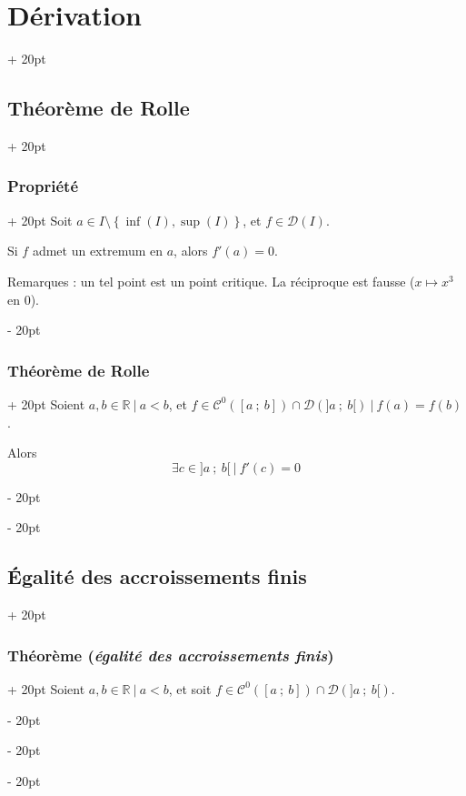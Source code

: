 \documentclass[a4paper, 12pt, twoside]{article}
\newcommand{\R}{\mathbb{R}} %
\newcommand{\seg}[2]{\left[ #1\ ;\ #2 \right]}
\newcommand{\lr}[1]{\left( #1 \right)}
\newcommand{\set}[1]{\left\{ #1 \right\}}
\newcommand{\ind}[1][20pt]{\advance\leftskip + #1}
\newcommand{\deind}[1][20pt]{\advance\leftskip - #1}
\newenvironment{indt}[2][20pt]{#2 \par \ind[#1]}{\par \deind} %
\begin{document}
\begin{indt}{\section{Dérivation}}
        \begin{indt}{\subsection{Théorème de Rolle}}
            \begin{indt}{\subsubsection{Propriété}}
                Soit $a \in I \setminus \set{\inf(I), \sup(I)}$, et $f \in \mathcal D(I)$.

                Si $f$ admet un extremum en $a$, alors $f'(a) = 0$.

                \vspace{12pt}
                
                Remarques : un tel point est un point critique.
                La réciproque est fausse ($x \longmapsto x^3$ en 0).
            \end{indt}

            \vspace{12pt}
            
            \begin{indt}{\subsubsection{Théorème de Rolle}}
                Soient $a, b \in \R\ |\ a < b$, et $f \in \mathcal C^0\!\lr{\seg a b} \cap \mathcal D\!\lr{]a\ ;\ b[}\ |\ f(a) = f(b)$.

                Alors
                \[
                    \exists c \in ]a\ ;\ b[\ |\ f'(c) = 0
                \]
            \end{indt}
        \end{indt}

        \vspace{12pt}
        
        \begin{indt}{\subsection{\'Egalité des accroissements finis}}
            \begin{indt}{\subsubsection{Théorème (\textit{égalité des accroissements finis})}}
                Soient $a, b \in \R\ |\ a < b$, et soit $f \in \mathcal C^0\!\lr{\seg a b} \cap \mathcal D\!\lr{]a\ ;\ b[}$.


\end{indt}
\end{indt}
\end{indt}
\end{document}
